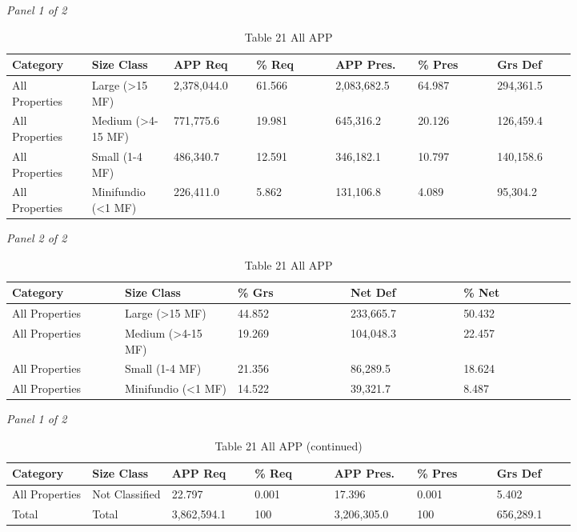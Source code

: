 \documentclass[12pt]{article}
\begin{document}
\begin{landscape}
\begin{table}[H]
\centering
\caption{Table 21 All APP}
\textit{Panel 1 of 2}\\[2pt]
{\fontsize{12}{14}\selectfont
\setlength{\tabcolsep}{3pt}
\renewcommand{\arraystretch}{1.08}
\begin{tabular}{p{0.117\linewidth}p{0.117\linewidth}p{0.117\linewidth}p{0.117\linewidth}p{0.117\linewidth}p{0.117\linewidth}p{0.117\linewidth}}
\toprule
Category & Size Class & APP Req & \% Req & APP Pres. & \% Pres & Grs Def \\
\midrule
All Properties & Large (>15 MF) & 2,378,044.0 & 61.566 & 2,083,682.5 & 64.987 & 294,361.5 \\
All Properties & Medium (>4-15 MF) & 771,775.6 & 19.981 & 645,316.2 & 20.126 & 126,459.4 \\
All Properties & Small (1-4 MF) & 486,340.7 & 12.591 & 346,182.1 & 10.797 & 140,158.6 \\
All Properties & Minifundio (<1 MF) & 226,411.0 & 5.862 & 131,106.8 & 4.089 & 95,304.2 \\
\bottomrule
\end{tabular}
}

\vspace{0.6em}

\textit{Panel 2 of 2}\\[2pt]
{\fontsize{12}{14}\selectfont
\setlength{\tabcolsep}{3pt}
\renewcommand{\arraystretch}{1.08}
\begin{tabular}{p{0.164\linewidth}p{0.164\linewidth}p{0.164\linewidth}p{0.164\linewidth}p{0.164\linewidth}}
\toprule
Category & Size Class & \% Grs & Net Def & \% Net \\
\midrule
All Properties & Large (>15 MF) & 44.852 & 233,665.7 & 50.432 \\
All Properties & Medium (>4-15 MF) & 19.269 & 104,048.3 & 22.457 \\
All Properties & Small (1-4 MF) & 21.356 & 86,289.5 & 18.624 \\
All Properties & Minifundio (<1 MF) & 14.522 & 39,321.7 & 8.487 \\
\bottomrule
\end{tabular}
}
\end{table}
\begin{table}[H]
\centering
\caption{Table 21 All APP (continued)}
\textit{Panel 1 of 2}\\[2pt]
{\fontsize{12}{14}\selectfont
\setlength{\tabcolsep}{3pt}
\renewcommand{\arraystretch}{1.08}
\begin{tabular}{p{0.117\linewidth}p{0.117\linewidth}p{0.117\linewidth}p{0.117\linewidth}p{0.117\linewidth}p{0.117\linewidth}p{0.117\linewidth}}
\toprule
Category & Size Class & APP Req & \% Req & APP Pres. & \% Pres & Grs Def \\
\midrule
All Properties & Not Classified & 22.797 & 0.001 & 17.396 & 0.001 & 5.402 \\
Total & Total & 3,862,594.1 & 100 & 3,206,305.0 & 100 & 656,289.1 \\
\bottomrule
\end{tabular}
}


\end{table}
\end{landscape}
\end{document}
